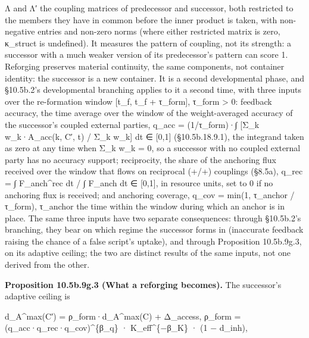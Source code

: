 \documentclass[
]{article}
\begin{document}
Λ and Λ′ the coupling matrices of predecessor and successor, both
restricted to the members they have in common before the inner product
is taken, with non-negative entries and non-zero norms (where either
restricted matrix is zero, κ\_struct is undefined). It measures the
pattern of coupling, not its strength: a successor with a much weaker
version of its predecessor's pattern can score 1. Reforging preserves
material continuity, the same components, not container identity: the
successor is a new container. It is a second developmental phase, and
§10.5b.2's developmental branching applies to it a second time, with
three inputs over the re-formation window {[}t\_f, t\_f + τ\_form{]},
τ\_form \textgreater{} 0: feedback accuracy, the time average over the
window of the weight-averaged accuracy of the successor's coupled
external parties, q\_acc = (1/τ\_form)·∫ {[}Σ\_k w\_k·A\_acc(k, C′, t) /
Σ\_k w\_k{]} dt ∈ {[}0,1{]} (§10.5b.18.9.1), the integrand taken as zero
at any time when Σ\_k w\_k = 0, so a successor with no coupled external
party has no accuracy support; reciprocity, the share of the anchoring
flux received over the window that flows on reciprocal (+/+) couplings
(§8.5a), q\_rec = ∫ F\_anch\^{}rec dt / ∫ F\_anch dt ∈ {[}0,1{]}, in
resource units, set to 0 if no anchoring flux is received; and anchoring
coverage, q\_cov = min(1, τ\_anchor / τ\_form), τ\_anchor the time
within the window during which an anchor is in place. The same three
inputs have two separate consequences: through §10.5b.2's branching,
they bear on which regime the successor forms in (inaccurate feedback
raising the chance of a false script's uptake), and through Proposition
10.5b.9g.3, on its adaptive ceiling; the two are distinct results of the
same inputs, not one derived from the other.

\textbf{Proposition 10.5b.9g.3 (What a reforging becomes).} The
successor's adaptive ceiling is

d\_A\^{}max(C′) = ρ\_form·d\_A\^{}max(C) + Δ\_access, ρ\_form =
(q\_acc·q\_rec·q\_cov)\^{}\{β\_q\} · K\_eff\^{}\{−β\_K\} · (1 − d\_inh),
\end{document}
